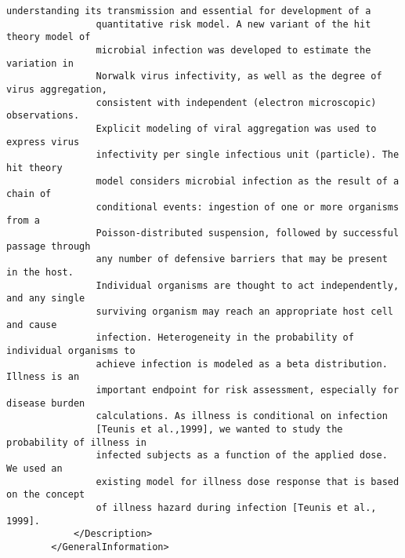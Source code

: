 \documentclass[a4paper]{report}
\begin{document}
\begin{lstlisting}[language=RAKIP, caption={Example of StudySample}]
                understanding its transmission and essential for development of a
                quantitative risk model. A new variant of the hit theory model of
                microbial infection was developed to estimate the variation in
                Norwalk virus infectivity, as well as the degree of virus aggregation,
                consistent with independent (electron microscopic) observations.
                Explicit modeling of viral aggregation was used to express virus
                infectivity per single infectious unit (particle). The hit theory
                model considers microbial infection as the result of a chain of
                conditional events: ingestion of one or more organisms from a
                Poisson-distributed suspension, followed by successful passage through
                any number of defensive barriers that may be present in the host.
                Individual organisms are thought to act independently, and any single
                surviving organism may reach an appropriate host cell and cause
                infection. Heterogeneity in the probability of individual organisms to
                achieve infection is modeled as a beta distribution. Illness is an
                important endpoint for risk assessment, especially for disease burden
                calculations. As illness is conditional on infection
                [Teunis et al.,1999], we wanted to study the probability of illness in
                infected subjects as a function of the applied dose. We used an
                existing model for illness dose response that is based on the concept
                of illness hazard during infection [Teunis et al., 1999].
            </Description>
        </GeneralInformation>


\end{lstlisting}
\end{document}
